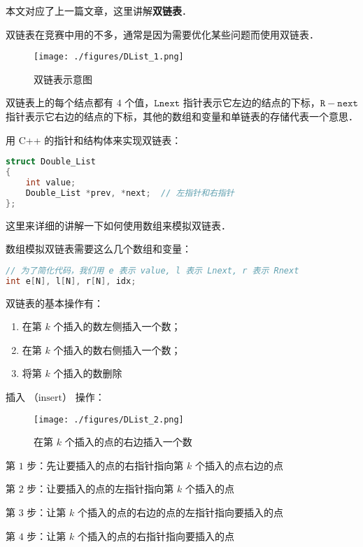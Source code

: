 
本文对应了上一篇文章，这里讲解\textbf{双链表}．

双链表在竞赛中用的不多，通常是因为需要优化某些问题而使用双链表．

\begin{figure}[ht]
\centering
\texttt{[image: ./figures/DList\_1.png]}
\caption{双链表示意图} \label{DList_fig1}
\end{figure}

双链表上的每个结点都有 $4$ 个值，$\mathtt{Lnext}$ 指针表示它左边的结点的下标，$\mathtt{R-next}$ 指针表示它右边的结点的下标，其他的数组和变量和单链表的存储代表一个意思．

用 C++ 的指针和结构体来实现双链表：
\begin{lstlisting}[language=cpp]
struct Double_List
{
    int value;
    Double_List *prev, *next;  // 左指针和右指针
};
\end{lstlisting}

这里来详细的讲解一下如何使用数组来模拟双链表．

数组模拟双链表需要这么几个数组和变量：
\begin{lstlisting}[language=cpp]
// 为了简化代码，我们用 e 表示 value, l 表示 Lnext, r 表示 Rnext
int e[N], l[N], r[N], idx;
\end{lstlisting}

双链表的基本操作有：\begin{enumerate}
\item 在第 $k$ 个插入的数左侧插入一个数；
\item 在第 $k$ 个插入的数右侧插入一个数；
\item 将第 $k$ 个插入的数删除
\end{enumerate}

插入 （$\text{insert}$） 操作：

\begin{figure}[ht]
\centering
\texttt{[image: ./figures/DList\_2.png]}
\caption{在第 $k$ 个插入的点的右边插入一个数} \label{DList_fig2}
\end{figure}

第 $1$ 步：先让要插入的点的右指针指向第 $k$ 个插入的点右边的点

第 $2$ 步：让要插入的点的左指针指向第 $k$ 个插入的点

第 $3$ 步：让第 $k$ 个插入的点的右边的点的左指针指向要插入的点

第 $4$ 步：让第 $k$ 个插入的点的右指针指向要插入的点


